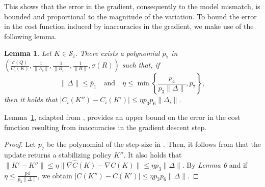 \documentclass[letterpaper, 10 pt, conference]{ieeeconf}  %
\newtheorem{lemma}{Lemma}
\begin{document}
This shows that the error in the gradient, consequently to the model mismatch, is bounded and proportional to the magnitude of the variation. To bound the error in the cost function induced by inaccuracies in the gradient, we make use of the following lemma.
\begin{lemma}
\label{lemma_3_7}
Let \( K \in \mathcal{S}_i \). There exists a polynomial \( p_7 \) in 
\(
\left( \frac{\sigma(Q)}{C_i(K)}, \frac{1}{\|A_i\|}, \frac{1}{\|B_i\|}, \frac{1}{\|R\|}, \sigma(R) \right)
\)
such that, if 
\begin{equation}
\|\Delta\| \leq \overline{p}_1 \quad \text{and} \quad \eta \leq \min \left\{ \frac{p_4}{p_3 \|\Delta\|}, p_7 \right\},
\end{equation}
then it holds that $|C_i(K'') - C_i(K')| \leq \eta p_3 p_6 \|\Delta_i\|.$

\end{lemma} \vspace{2mm}
Lemma~\ref{lemma_3_7}, adapted from \cite[Lemma 15]{zhao2025policy},  provides an upper bound on the error in the cost function resulting from inaccuracies in the gradient descent step. \vspace{2mm} \\ 
\begin{proof} Let $p_7$ be the polynomial of the step-size in \cite[Theorem 7]{fazel2018global}. Then, it follows from \cite[Theorem 7]{fazel2018global} that the update returns a stabilizing policy $K''$. It also holds that $\|K' - K''\| \leq \eta\|\nabla \hat{C}(K) - \nabla C(K)\| \leq \eta p_3 \|\Delta\|$. By \textit{Lemma 6} and if $\eta \leq \frac{p4}{p_3 \|\Delta\|}$, we obtain  $|C(K'') - C(K')| \leq \eta p_3 p_6 \|\Delta\|.$
\end{proof} 
\end{document}
